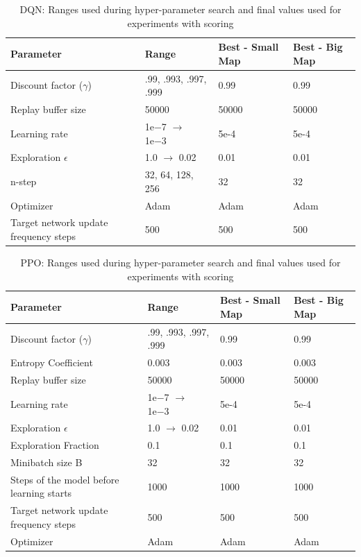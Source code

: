 \documentclass[12pt]{report}
\begin{document}
\begin{table} [!h]
\begin{center}
 \begin{tabular}{l | l | l | l} 
 \hline
 Parameter & Range & Best - Small Map & Best - Big Map  \\ [0.5ex] 
 \hline\hline
 Discount factor ($\gamma$) & {.99, .993, .997, .999} & 0.99 & 0.99 \\ 
 Replay buffer size & 50000 & 50000 & 50000\\
 Learning rate & 1e−7 $\rightarrow$ 1e−3 & 5e-4 & 5e-4\\
 Exploration $\epsilon$ & 1.0 $\rightarrow$ 0.02 & 0.01 & 0.01\\ 
 n-step & {32, 64, 128, 256} & 32 & 32\\
 Optimizer & Adam & Adam & Adam \\ 
 Target network update frequency steps & 500 & 500 & 500\\
 \hline
\end{tabular}
\caption{DQN: Ranges used during hyper-parameter search and final values used for experiments with scoring}
\label{table:DQNRangesHyperparameter}
\end{center}
\end{table}

\begin{table} [!h]
\begin{center}
 \begin{tabular}{l | l | l | l} 
 \hline
 Parameter & Range & Best - Small Map & Best - Big Map  \\ [0.5ex] 
 \hline\hline
 Discount factor ($\gamma$) & {.99, .993, .997, .999} & 0.99 & 0.99 \\ 
 Entropy Coefficient & 0.003 & 0.003 & 0.003 \\
 Replay buffer size & 50000 & 50000 & 50000\\
 Learning rate & 1e−7 $\rightarrow$ 1e−3 & 5e-4 & 5e-4\\
 Exploration $\epsilon$ & 1.0 $\rightarrow$ 0.02 & 0.01 & 0.01\\ 
 Exploration Fraction & 0.1 & 0.1 & 0.1\\
 Minibatch size B & 32 & 32 & 32\\
 Steps of the model before learning starts & 1000 & 1000 & 1000\\
 Target network update frequency steps & 500 & 500 & 500\\
 Optimizer & Adam & Adam & Adam \\ 
 \hline
\end{tabular}
\caption{PPO: Ranges used during hyper-parameter search and final values used for experiments with scoring}
\label{table:PPORangesHyperparameter}
\end{center}
\end{table}
\end{document}
